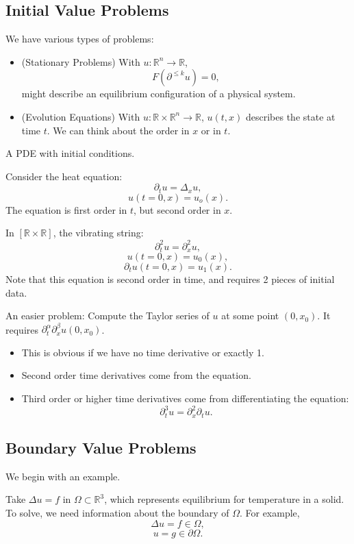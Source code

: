 \documentclass[11pt]{scrartcl}
\newcommand{\R}{\mathbb{R}}
\begin{document}
\subsection{Initial Value Problems}
We have various types of problems:
\begin{itemize}
\item (Stationary Problems) With $u : \R^n \rightarrow \R$,$$F(\partial^{\le k} u) = 0,$$ might describe an equilibrium configuration of a physical system.
\item (Evolution Equations) With $u : \R\times \R^n\rightarrow \R$, $u(t, x)$ describes the state at time $t$.  We can think about the order in $x$ or in $t$. 
\end{itemize}
\begin{definition} A PDE with initial conditions.
\end{definition}
\begin{example} Consider the heat equation:
$$\partial_t u = \Delta_x u,$$
$$ u(t = 0, x) = u_o(x).$$
The equation is first order in $t$, but second order in $x$.
\end{example} 
\begin{example}
In $[\R \times \R]$, the vibrating string:
$$\partial_t^2 u = \partial_x^2 u,$$
$$u(t=0, x) = u_0(x),$$
$$\partial_t u(t=0, x) = u_1(x).$$
Note that this equation is second order in time, and requires 2 pieces of initial data.

An easier problem: Compute the Taylor series of $u$ at some point $(0, x_0)$. It requires $\partial_t^{\alpha} \partial_x^{\beta} u(0, x_0)$.  
\begin{itemize}
\item This is obvious if we have no time derivative or exactly 1.  
\item Second order time derivatives come from the equation.
\item Third order or higher time derivatives come from differentiating the equation:
$$\partial_t^3 u = \partial_x^2 \partial_t u.$$
\end{itemize}
\end{example}
\subsection{Boundary Value Problems}
We begin with an example.
\begin{example} Take $\Delta u = f$ in $\Omega \subset \R^3$, which represents equilibrium for temperature in a solid.  To solve, we need information about the boundary of $\Omega$.  For example,
$$\Delta u = f \in \Omega,$$
$$u = g \in \partial \Omega.$$
\end{example}
\end{document}
